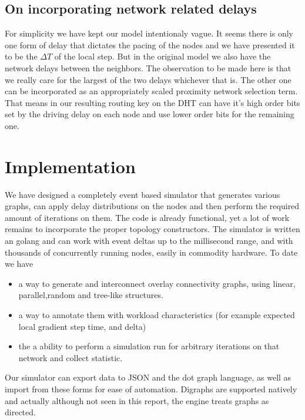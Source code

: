 \documentclass[12pt,notitlepage]{article}
\begin{document}
\subsection{On incorporating network related delays}
For simplicity we have kept our model intentionaly vague. It seems there is
only one form of delay that dictates the pacing of the nodes and we have
presented it to be the $\Delta T$ of the local step. But in the 
original model we also have the network delays between the neighbors. The 
observation to be made here is that we really care for the largest of the two
delays whichever that is. The other one can be incorporated as an appropriately
scaled proximity network selection term. That means in our resulting routing
key on the DHT can have it's high order bits set by the driving delay on each
node and use lower order bits for the remaining one. 

\section{Implementation}
We have designed a completely event based simulator that generates various graphs, 
can apply delay distributions on the nodes and then perform the required amount
of iterations on them. The code is already functional, yet a lot of work remains
to incorporate the proper topology constructors. The simulator is written an golang
and can work with event deltas up to the millisecond range, and with thousands of
concurrently running nodes, easily in commodity hardware. To date we have
\begin{itemize}
	\item a way to generate and interconnect overlay connectivity graphs, using linear,
		parallel,random and tree-like structures.
	\item a way to annotate them with workload characteristics (for example expected
		local gradient step time, and delta)
	\item the a ability to perform a simulation run for arbitrary iterations on that
		network and collect statistic.
\end{itemize}
Our simulator can export data to JSON and the dot graph language, as well as import from these forms for ease
of automation. Digraphs are supported natively and actually although not seen in this report, 
the engine treats graphs as directed.
\end{document}

